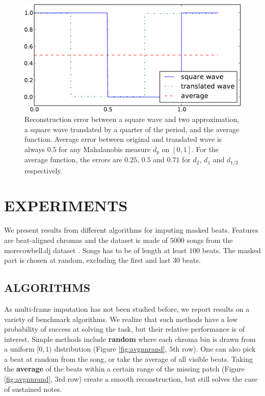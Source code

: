 \documentclass{article}
\begin{document}
\begin{figure}[t]
\begin{center}
\includegraphics[width=.8\columnwidth]{square}
\end{center}
\caption{Reconstruction error between a square wave and two approximation,
a square wave translated by a quarter of the period, and the average
function. Average error between original and translated wave is always $0.5$
for any Mahalanobis measure $d_p$ on $[0,1]$. 
For the average function, the errors are
$0.25$, $0.5$ and $0.71$ for $d_2$, $d_1$ and $d_{1/2}$ respectively.
\label{fig:square}}
\end{figure}

\section{EXPERIMENTS}
\label{sec:exp}
We present results from different algorithms for imputing masked
beats.  Features are beat-aligned chromas and the dataset is made of
$5000$ songs from the morecowbell.dj dataset
\cite{Bertin-Mahieux2010a}. Songs has to be of length at least $100$
beats.  The masked part is chosen at random, excluding the first and
last $30$ beats.

\subsection{ALGORITHMS}
\label{ssec:algo}
As multi-frame imputation has not been studied before, we report
results on a variety of benchmark algorithms. We realize that such
methods have a low probability of success at solving the task, but
their relative performance is of interest.  Simple methods include
\textbf{random} where each chroma bin is drawn from a uniform $[0,1)$
distribution (Figure \ref{fig:avgnnrand}, $5$th row).  One can also
pick a beat at random from the song, or take the average of all
visible beats. Taking the \textbf{average} of the beats within a certain
range of the missing patch (Figure \ref{fig:avgnnrand}, $3$rd row)
create a smooth reconstruction, but still solves the case of
sustained notes.
\end{document}
